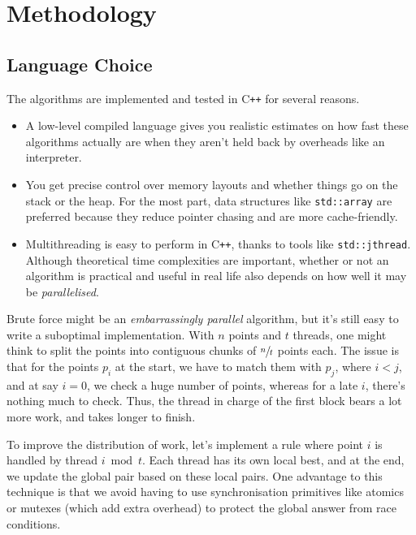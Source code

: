 
\chapter{Methodology}

\section{Language Choice}

The algorithms are implemented and tested in C\texttt{++} for several reasons.

\begin{itemize}
    \item A low-level compiled language gives you realistic estimates on how fast these algorithms
    actually are when they aren't held back by overheads like an interpreter.
    \item You get precise control over memory layouts and whether things go on the stack or the
    heap. For the most part, data structures like \texttt{std::array} are preferred because
    they reduce pointer chasing and are more cache-friendly.
    \item Multithreading is easy to perform in C\texttt{++}, thanks to tools like \texttt{std::jthread}.
    Although theoretical time complexities are important, whether or not an algorithm is practical
    and useful in real life also depends on how well it may be \textit{parallelised}.
\end{itemize}

\begin{aside}
    Brute force might be an \textit{embarrassingly parallel} algorithm, but it's still easy to write
    a suboptimal implementation. With $n$ points and $t$ threads, one might think to split
    the points into contiguous chunks of $\sfrac{n}{t}$ points each. The issue is that for the
    points $p_{i}$ at the start, we have to match them with $p_{j}$, where $i < j$, and at
    say $i = 0$, we check a huge number of points, whereas for a late $i$, there's nothing much to check.
    Thus, the thread in charge of the first block bears a lot more work, and takes longer to finish.

    To improve the distribution of work, let's implement a rule where point $i$ is handled by thread
    $i \bmod t$. Each thread has its own local best, and at the end, we update the global pair
    based on these local pairs. One advantage to this technique is that we avoid having to use
    synchronisation primitives like atomics or mutexes (which add extra overhead) to protect the global
    answer from race conditions.
\end{aside}

